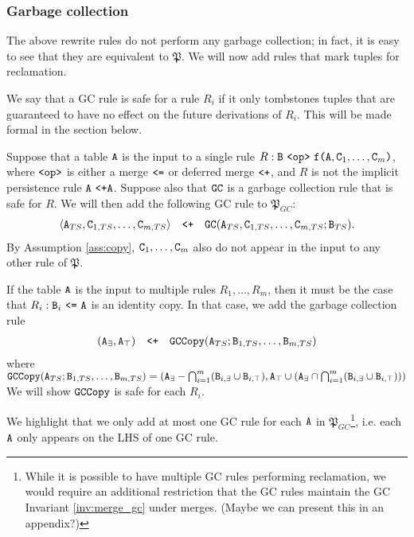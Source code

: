 \documentclass{article}
\numberwithin{equation}{section}
\renewcommand{\tt}[1]{\ifmmode\text{\texttt{#1}}\else\texttt{#1}\fi}
\begin{document}
\subsubsection{Garbage collection}
The above rewrite rules do not perform any garbage collection; in fact, it is easy to see that they are equivalent to $\mathfrak{P}$.
We will now add rules that mark tuples for reclamation.

We say that a GC rule is safe for a rule $R_i$ if it only tombstones tuples that are guaranteed to have no effect on the future derivations of $R_i$.
This will be made formal in the section below.

Suppose that a table $\tt{A}$ is the input to a single rule $R: \tt{B} ~\tt{<op>}~ \tt{f}\tt{(}\tt{A},\tt{C}_1,\dots,\tt{C}_m\tt{)}$, where $\tt{<op>}$ is either a merge $\tt{<=}$ or deferred merge $\tt{<+}$, and $R$ is not the implicit persistence rule $\tt{A} ~\tt{<+} \tt{A}$.
Suppose also that $\tt{GC}$ is a garbage collection rule that is safe for $R$.
We will then add the following GC rule to $\mathfrak{P}_{GC}$:
\begin{align}
\langle \tt{A}_{TS}, \tt{C}_{1,TS}, \dots, \tt{C}_{m,TS} \rangle
\quad\tt{<+}\quad
\tt{GC}(\tt{A}_{TS}, \tt{C}_{1,TS}, \dots, \tt{C}_{m,TS}; \tt{B}_{TS}).
\end{align}
By Assumption \ref{ass:copy}, $\tt{C}_1,\dots,\tt{C}_m$ also do not appear in the input to any other rule of $\mathfrak{P}$.

If the table $\tt{A}$ is the input to multiple rules $R_1, \dots, R_m$, then it must be the case that $R_i: \tt{B}_i ~\tt{<=}~ \tt{A}$ is an identity copy.
In that case, we add the garbage collection rule
\begin{align}
(\tt{A}_\exists, \tt{A}_\top) \quad\tt{<+}\quad \tt{GCCopy}(\tt{A}_{TS}; \tt{B}_{1,TS}, \dots, \tt{B}_{m,TS})
\end{align}
where $\tt{GCCopy}(\tt{A}_{TS}; \tt{B}_{1,TS}, \dots, \tt{B}_{m,TS}) = \left(\tt{A}_\exists - \bigcap_{i=1}^m (\tt{B}_{i,\exists} \cup \tt{B}_{i,\top}), \tt{A}_\top \cup \left(\tt{A}_\exists \cap \bigcap_{i=1}^m (\tt{B}_{i,\exists} \cup \tt{B}_{i,\top})\right)\right)$
We will show $\tt{GCCopy}$ is safe for each $R_i$.

We highlight that we only add at most one GC rule for each $\tt{A}$ in $\mathfrak{P}_{GC}$\footnote{
While it is possible to have multiple GC rules performing reclamation, we would require an additional restriction that the GC rules maintain the GC Invariant \ref{inv:merge_gc} under merges.
(Maybe we can present this in an appendix?)
}, i.e. each $\tt{A}$ only appears on the LHS of one GC rule.
\end{document}
